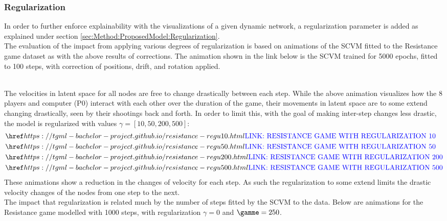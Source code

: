 \subsubsection{Regularization}
\label{sec:ResearchQuestion3:Regularization}
In order to further enforce explainability with the visualizations of a given dynamic network, a regularization parameter is added as explained under section \ref{sec:Method:ProposedModel:Regularization}.
\\
The evaluation of the impact from applying various degrees of regularization is based on animations of the SCVM fitted to the Resistance game dataset as with the above results of corrections.
The animation shown in the link below is the SCVM trained for 5000 epochs, fitted to 100 steps, with correction of positions, drift, and rotation applied.
\begin{center}
\end{center}
\\
The velocities in latent space for all nodes are free to change drastically between each step.
While the above animation visualizes how the 8 players and computer (P0) interact with each other over the duration of the game, their movements in latent space are to some extend changing drastically, seen by their shootings back and forth.
In order to limit this, with the goal of making inter-step changes less drastic, the model is regularized with values $\gamma = [10, 50, 200, 500]$:
\begin{align*}
    &\bluehref{https://tgml-bachelor-project.github.io/resistance-regu10.html}{\text{LINK: RESISTANCE GAME WITH REGULARIZATION 10}} \\
    &\bluehref{https://tgml-bachelor-project.github.io/resistance-regu50.html}{\text{LINK: RESISTANCE GAME WITH REGULARIZATION 50}} \\
    &\bluehref{https://tgml-bachelor-project.github.io/resistance-regu200.html}{\text{LINK: RESISTANCE GAME WITH REGULARIZATION 200}} \\
    &\bluehref{https://tgml-bachelor-project.github.io/resistance-regu500.html}{\text{LINK: RESISTANCE GAME WITH REGULARIZATION 500}}
\end{align*}
These animations show a reduction in the changes of velocity for each step. As such the regularization to some extend limits the drastic velocity changes of the nodes from one step to the next. 
\\
The impact that regularization is related much by the number of steps fitted by the SCVM to the data.
Below are animations for the Resistance game modelled with 1000 steps, with regularization $\gamma = 0$ and $\gamme = 250$.

